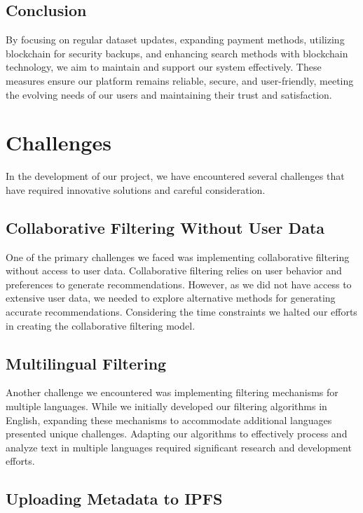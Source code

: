 \documentclass{article}
\begin{document}
\subsection{Conclusion}

By focusing on regular dataset updates, expanding payment methods, utilizing blockchain for security backups, and enhancing search methods with blockchain technology, we aim to maintain and support our system effectively. These measures ensure our platform remains reliable, secure, and user-friendly, meeting the evolving needs of our users and maintaining their trust and satisfaction.

\section{Challenges}

In the development of our project, we have encountered several challenges that have required innovative solutions and careful consideration.

\subsection{Collaborative Filtering Without User Data}

One of the primary challenges we faced was implementing collaborative filtering without access to user data. Collaborative filtering relies on user behavior and preferences to generate recommendations. However, as we did not have access to extensive user data, we needed to explore alternative methods for generating accurate recommendations. Considering the time constraints we halted our efforts in creating the collaborative filtering model.

\subsection{Multilingual Filtering}

Another challenge we encountered was implementing filtering mechanisms for multiple languages. While we initially developed our filtering algorithms in English, expanding these mechanisms to accommodate additional languages presented unique challenges. Adapting our algorithms to effectively process and analyze text in multiple languages required significant research and development efforts.

\subsection{Uploading Metadata to IPFS}
\end{document}
